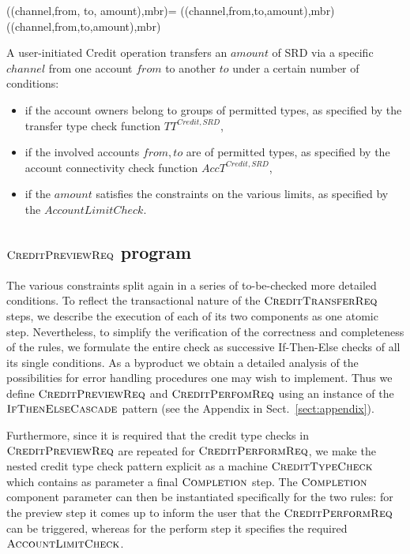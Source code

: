 \begin{asm}
((channel,from, to, amount),mbr)=\+
   ((channel,from,to,amount),mbr)  \\
   ((channel,from,to,amount),mbr) 
\end{asm}


A user-initiated Credit operation transfers an $amount$ of SRD via a specific $channel$ from one account $from$ to another $to$ under a certain number of conditions:

\begin{itemize}
	\item if the account owners belong to groups of permitted types, as specified by the transfer type check function $TT^{Credit,SRD}$, 
	\item if the involved accounts $from,to$ are of permitted types, as specified by  the account connectivity check function $AccT^{Credit,SRD}$, 
	\item if the $amount$ satisfies the constraints on the various limits, as specified by the $AccountLimitCheck$.
\end{itemize}


\subsection{ $\hbox{\sc CreditPreviewReq}$ program}
\label{sect:creditpreview}

The various constraints split again in a series of to-be-checked  more detailed 
conditions. 
To reflect the transactional nature of the $\hbox{\sc CreditTransferReq}$ steps, we describe the execution of each of its two components as one atomic step. Nevertheless, to simplify the verification of the correctness and completeness of the rules, we formulate the entire
check as successive If-Then-Else checks of all its single conditions. As a byproduct we obtain a detailed analysis of the possibilities for error handling procedures one may wish to implement. Thus we define  $\hbox{\sc CreditPreviewReq}$ and $\hbox{\sc CreditPerfomReq}$ using an instance of the $\hbox{\sc IfThenElseCascade}$ pattern (see the Appendix in Sect.~\ref{sect:appendix}). 

Furthermore, since it is required that the credit type checks in $\hbox{\sc CreditPreviewReq}$ are repeated for $\hbox{\sc CreditPerformReq}$, we 
make the nested credit type check pattern explicit as a machine $\hbox{\sc CreditTypeCheck}$ which contains as parameter a final $\hbox{\sc Completion}$ step. The $\hbox{\sc Completion}$ component parameter can then be instantiated specifically for the two rules: for the preview step it comes up to inform the user that the $\hbox{\sc CreditPerformReq}$ can be triggered, whereas for the perform step it specifies the required $\hbox{\sc AccountLimitCheck}$. 


